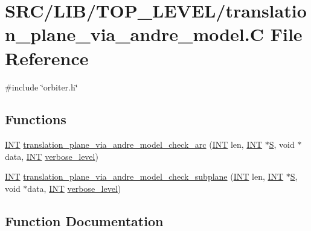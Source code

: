 \hypertarget{translation__plane__via__andre__model_8_c}{}\section{S\+R\+C/\+L\+I\+B/\+T\+O\+P\+\_\+\+L\+E\+V\+E\+L/translation\+\_\+plane\+\_\+via\+\_\+andre\+\_\+model.C File Reference}
\label{translation__plane__via__andre__model_8_c}
{\ttfamily \#include \char`\"{}orbiter.\+h\char`\"{}}\newline
\subsection*{Functions}
\begin{DoxyCompactItemize}
\item 
\mbox{\hyperlink{galois_8h_a09fddde158a3a20bd2dcadb609de11dc}{I\+NT}} \mbox{\hyperlink{translation__plane__via__andre__model_8_c_ae2e2edd0437d24ac650e918ec58a7410}{translation\+\_\+plane\+\_\+via\+\_\+andre\+\_\+model\+\_\+check\+\_\+arc}} (\mbox{\hyperlink{galois_8h_a09fddde158a3a20bd2dcadb609de11dc}{I\+NT}} len, \mbox{\hyperlink{galois_8h_a09fddde158a3a20bd2dcadb609de11dc}{I\+NT}} $\ast$\mbox{\hyperlink{simeon_8_c_adab47f8243f1b5a2c31df2535d6b37d0}{S}}, void $\ast$data, \mbox{\hyperlink{galois_8h_a09fddde158a3a20bd2dcadb609de11dc}{I\+NT}} \mbox{\hyperlink{simeon_8_c_a818073fbcc2f439e7c56952f67386122}{verbose\+\_\+level}})
\item 
\mbox{\hyperlink{galois_8h_a09fddde158a3a20bd2dcadb609de11dc}{I\+NT}} \mbox{\hyperlink{translation__plane__via__andre__model_8_c_abf204a455a8698c7340fe92376031d50}{translation\+\_\+plane\+\_\+via\+\_\+andre\+\_\+model\+\_\+check\+\_\+subplane}} (\mbox{\hyperlink{galois_8h_a09fddde158a3a20bd2dcadb609de11dc}{I\+NT}} len, \mbox{\hyperlink{galois_8h_a09fddde158a3a20bd2dcadb609de11dc}{I\+NT}} $\ast$\mbox{\hyperlink{simeon_8_c_adab47f8243f1b5a2c31df2535d6b37d0}{S}}, void $\ast$data, \mbox{\hyperlink{galois_8h_a09fddde158a3a20bd2dcadb609de11dc}{I\+NT}} \mbox{\hyperlink{simeon_8_c_a818073fbcc2f439e7c56952f67386122}{verbose\+\_\+level}})
\end{DoxyCompactItemize}


\subsection{Function Documentation}
\mbox{\label{translation__plane__via__andre__model_8_c_ae2e2edd0437d24ac650e918ec58a7410}} 
